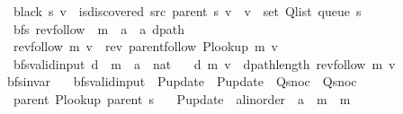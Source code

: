 \begin{isabellebody}
\ \ {\isachardoublequoteopen}black\ s\ v\ {\isasymequiv}\ is{\isacharunderscore}{\kern0pt}discovered\ src\ {\isacharparenleft}{\kern0pt}parent\ s{\isacharparenright}{\kern0pt}\ v\ {\isasymand}\ v\ {\isasymnotin}\ set\ {\isacharparenleft}{\kern0pt}Q{\isacharunderscore}{\kern0pt}list\ {\isacharparenleft}{\kern0pt}queue\ s{\isacharparenright}{\kern0pt}{\isacharparenright}{\kern0pt}{\isachardoublequoteclose}\isanewline
\isanewline
{}\isamarkupfalse%
\ {\isacharparenleft}{\kern0pt}\ bfs{\isacharparenright}{\kern0pt}\ rev{\isacharunderscore}{\kern0pt}follow\ {\isacharcolon}{\kern0pt}{\isacharcolon}{\kern0pt}\ {\isachardoublequoteopen}{\isacharprime}{\kern0pt}m\ {\isasymRightarrow}\ {\isacharprime}{\kern0pt}a\ {\isasymRightarrow}\ {\isacharprime}{\kern0pt}a\ dpath{\isachardoublequoteclose}\ \isanewline
\ \ {\isachardoublequoteopen}rev{\isacharunderscore}{\kern0pt}follow\ m\ v\ {\isasymequiv}\ rev\ {\isacharparenleft}{\kern0pt}parent{\isachardot}{\kern0pt}follow\ {\isacharparenleft}{\kern0pt}P{\isacharunderscore}{\kern0pt}lookup\ m{\isacharparenright}{\kern0pt}\ v{\isacharparenright}{\kern0pt}{\isachardoublequoteclose}\isanewline
\isanewline
{}\isamarkupfalse%
\ {\isacharparenleft}{\kern0pt}\ bfs{\isacharunderscore}{\kern0pt}valid{\isacharunderscore}{\kern0pt}input{\isacharparenright}{\kern0pt}\ d\ {\isacharcolon}{\kern0pt}{\isacharcolon}{\kern0pt}\ {\isachardoublequoteopen}{\isacharprime}{\kern0pt}m\ {\isasymRightarrow}\ {\isacharprime}{\kern0pt}a\ {\isasymRightarrow}\ nat{\isachardoublequoteclose}\ \isanewline
\ \ {\isachardoublequoteopen}d\ m\ v\ {\isasymequiv}\ dpath{\isacharunderscore}{\kern0pt}length\ {\isacharparenleft}{\kern0pt}rev{\isacharunderscore}{\kern0pt}follow\ m\ v{\isacharparenright}{\kern0pt}{\isachardoublequoteclose}\isanewline
\isanewline
{}\isamarkupfalse%
\ bfs{\isacharunderscore}{\kern0pt}invar\ {\isacharequal}{\kern0pt}\isanewline
\ \ bfs{\isacharunderscore}{\kern0pt}valid{\isacharunderscore}{\kern0pt}input\ \ P{\isacharunderscore}{\kern0pt}update\ {\isacharequal}{\kern0pt}\ P{\isacharunderscore}{\kern0pt}update\ \ Q{\isacharunderscore}{\kern0pt}snoc\ {\isacharequal}{\kern0pt}\ Q{\isacharunderscore}{\kern0pt}snoc\ {\isacharplus}{\kern0pt}\isanewline
\ \ parent\ {\isachardoublequoteopen}P{\isacharunderscore}{\kern0pt}lookup\ {\isacharparenleft}{\kern0pt}parent\ s{\isacharparenright}{\kern0pt}{\isachardoublequoteclose}\ \isanewline
\ \ P{\isacharunderscore}{\kern0pt}update\ {\isacharcolon}{\kern0pt}{\isacharcolon}{\kern0pt}\ {\isachardoublequoteopen}{\isacharprime}{\kern0pt}a{\isacharcolon}{\kern0pt}{\isacharcolon}{\kern0pt}linorder\ {\isasymRightarrow}\ {\isacharprime}{\kern0pt}a\ {\isasymRightarrow}\ {\isacharprime}{\kern0pt}m\ {\isasymRightarrow}\ {\isacharprime}{\kern0pt}m{\isachardoublequoteclose}\ \isanewline

\end{isabellebody}
